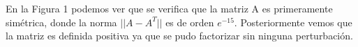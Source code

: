 \documentclass[12pt]{article}
\begin{document}
En la Figura 1 podemos ver que se verifica que la matriz A es primeramente simétrica, donde la norma $||A - A^T||$ es de orden $e^{-15}$. Posteriormente vemos que la matriz es definida positiva ya que se pudo factorizar sin ninguna perturbación.

\begin{figure}[H]
	\centering
	\hfill
\end{figure}

\begin{figure}[H]
	\centering
	\hfill
\end{figure}
\end{document}
